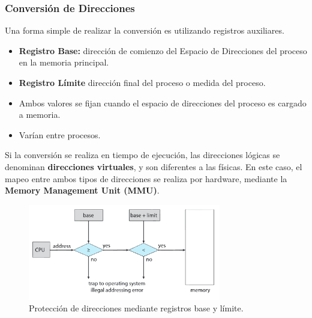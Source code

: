 \subsubsection{Conversión de Direcciones}
Una forma simple de realizar la conversión es utilizando registros auxiliares.
\begin{itemize}
    \item \textbf{Registro Base:} dirección de comienzo del Espacio de Direcciones del proceso en la memoria principal.
    \item \textbf{Registro Límite} dirección final del proceso o medida del proceso.
    \item Ambos valores se fijan cuando el espacio de direcciones del proceso es cargado a memoria.
    \item Varían entre procesos.
\end{itemize}
    Si la conversión se realiza en tiempo de ejecución, las direcciones lógicas se denominan \textbf{direcciones virtuales}, y son diferentes a las físicas.
En este caso, el mapeo entre ambos tipos de direcciones se realiza por hardware, mediante la \textbf{Memory Management Unit (MMU)}.
\begin{figure}
    \begin{center}
        \includegraphics[width=0.75\textwidth]{assets/ConversionDirecciones.pdf}
    \end{center}
    \caption{Protección de direcciones mediante registros base y límite.}\label{fig:69}
\end{figure}
